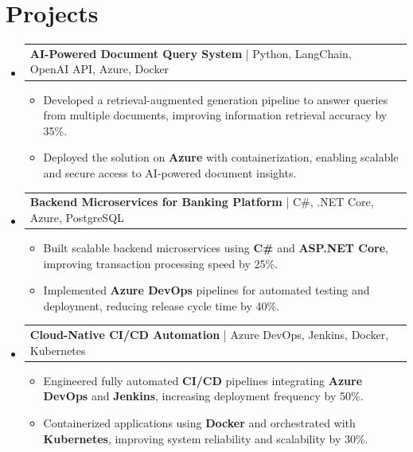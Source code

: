 \documentclass[letterpaper,11pt]{article}
\makeatletter
\newcommand{\resumeItem}[1]{
  \item\footnotesize{
    {#1 \vspace{-2pt}}
  }
}
\newcommand{\resumeProjectHeading}[2]{
    \item
    \begin{tabular*}{1.001\textwidth}{l@{\extracolsep{\fill}}r}
      \small#1 & \textbf{\small #2}\\
    \end{tabular*}\vspace{-7pt}
}
\newcommand{\resumeSubHeadingListStart}{\begin{itemize}[leftmargin=0pt, label={}]}
\newcommand{\resumeSubHeadingListEnd}{\end{itemize}}
\newcommand{\resumeItemListStart}{\begin{itemize}[leftmargin=*]}
\newcommand{\resumeItemListEnd}{\end{itemize}\vspace{-5pt}}
\makeatother
\begin{document}
\section{Projects}
    \vspace{-5pt}
    \resumeSubHeadingListStart

      \resumeProjectHeading
          {\textbf{AI-Powered Document Query System} | Python, LangChain, OpenAI API, Azure, Docker}{ }
        \resumeItemListStart
            \resumeItem{Developed a retrieval-augmented generation pipeline to answer queries from multiple documents, improving information retrieval accuracy by 35\%.}
            \resumeItem{Deployed the solution on \textbf{Azure} with containerization, enabling scalable and secure access to AI-powered document insights.}
        \resumeItemListEnd
        \vspace{-12pt}

      \resumeProjectHeading
          {\textbf{Backend Microservices for Banking Platform} | C\#, .NET Core, Azure, PostgreSQL}{ }
        \resumeItemListStart
            \resumeItem{Built scalable backend microservices using \textbf{C\#} and \textbf{ASP.NET Core}, improving transaction processing speed by 25\%.}
            \resumeItem{Implemented \textbf{Azure DevOps} pipelines for automated testing and deployment, reducing release cycle time by 40\%.}
        \resumeItemListEnd
        \vspace{-12pt}

      \resumeProjectHeading
          {\textbf{Cloud-Native CI/CD Automation} | Azure DevOps, Jenkins, Docker, Kubernetes}{ }
        \resumeItemListStart
            \resumeItem{Engineered fully automated \textbf{CI/CD} pipelines integrating \textbf{Azure DevOps} and \textbf{Jenkins}, increasing deployment frequency by 50\%.}
            \resumeItem{Containerized applications using \textbf{Docker} and orchestrated with \textbf{Kubernetes}, improving system reliability and scalability by 30\%.}
        \resumeItemListEnd

    \resumeSubHeadingListEnd
\end{document}
